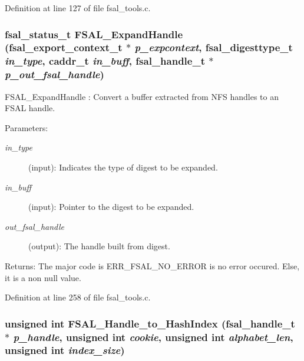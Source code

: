 Definition at line 127 of file fsal\_\-tools.c.
\subsubsection[{FSAL\_\-ExpandHandle}]{\setlength{\rightskip}{0pt plus 5cm}fsal\_\-status\_\-t FSAL\_\-ExpandHandle (fsal\_\-export\_\-context\_\-t $\ast$ {\em p\_\-expcontext}, \/  fsal\_\-digesttype\_\-t {\em in\_\-type}, \/  caddr\_\-t {\em in\_\-buff}, \/  fsal\_\-handle\_\-t $\ast$ {\em p\_\-out\_\-fsal\_\-handle})}\label{fsal__tools_8c_8b31958e3ab2bea2852975bfbae1e6e7}


FSAL\_\-ExpandHandle : Convert a buffer extracted from NFS handles to an FSAL handle.

\begin{Desc}
\item[Parameters:]
\begin{description}
\item[{\em in\_\-type}](input): Indicates the type of digest to be expanded. \item[{\em in\_\-buff}](input): Pointer to the digest to be expanded. \item[{\em out\_\-fsal\_\-handle}](output): The handle built from digest.\end{description}
\end{Desc}
\begin{Desc}
\item[Returns:]The major code is ERR\_\-FSAL\_\-NO\_\-ERROR is no error occured. Else, it is a non null value. \end{Desc}


Definition at line 258 of file fsal\_\-tools.c.
\subsubsection[{FSAL\_\-Handle\_\-to\_\-HashIndex}]{\setlength{\rightskip}{0pt plus 5cm}unsigned int FSAL\_\-Handle\_\-to\_\-HashIndex (fsal\_\-handle\_\-t $\ast$ {\em p\_\-handle}, \/  unsigned int {\em cookie}, \/  unsigned int {\em alphabet\_\-len}, \/  unsigned int {\em index\_\-size})}\label{fsal__tools_8c_a08050a4cea7a2bd7f00b81687ffca3f}


